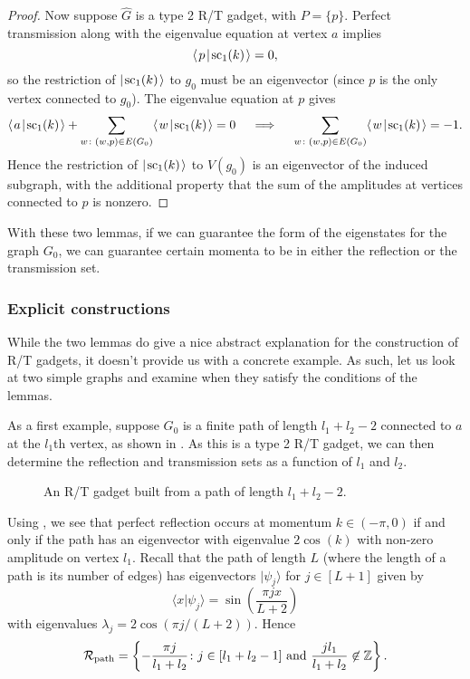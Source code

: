 \documentclass[../thesis-main/thesis-main]{subfiles}
\begin{document}
\begin{proof}
Now suppose $\widehat{G}$ is a type 2 R/T gadget, with $P = \{p\}$.  Perfect transmission along with the eigenvalue equation at vertex $a$ implies
\begin{equation}
\langle\mspace{2mu} p \mspace{2mu} | \mspace{2mu} \text{sc}_1(k)\mspace{2mu} \rangle = 0,
\end{equation}
so the restriction of $|\mspace{2mu} \text{sc}_1(k) \mspace{2mu} \rangle$ to $g_0$ must be an eigenvector (since $p$ is the only vertex connected to $g_0$).  The eigenvalue equation at $p$ gives
\begin{equation}
  \langle\mspace{2mu} a \mspace{2mu} | \mspace{2mu} \text{sc}_1(k)\mspace{2mu} \rangle 
  + \sum_{w \colon (w,p)\in E(G_0)} \langle\mspace{2mu} w \mspace{2mu} | \mspace{2mu} \text{sc}_1(k)\mspace{2mu} \rangle = 0 
  \quad\implies\quad
  \sum_{w \colon (w,p)\in E(G_0)} \langle\mspace{2mu} w \mspace{2mu} | \mspace{2mu} \text{sc}_1(k)\mspace{2mu} \rangle = -1.
\end{equation}
Hence the restriction of $|\mspace{2mu} \text{sc}_1(k) \mspace{2mu} \rangle$ to $V(g_0)$ is an eigenvector of the induced subgraph, with the additional property that the sum of the amplitudes at vertices connected to $p$ is nonzero.
\end{proof}

With these two lemmas, if we can guarantee the form of the eigenstates for the graph $G_0$, we can guarantee certain momenta to be in either the reflection or the transmission set.


\subsubsection{Explicit constructions}\label{sec:rt_ex}

While the two lemmas do give a nice abstract explanation for the construction of R/T gadgets, it doesn't provide us with a concrete example. As such, let us look at two simple graphs and examine when they satisfy the conditions of the lemmas.

As a first example, suppose $G_0$ is a finite path of length $l_1+l_2-2$ connected to $a$ at the $l_1$th vertex, as shown in .  As this is a type 2 R/T gadget, we can then determine the reflection and transmission sets as a function of $l_1$ and $l_2$.


\begin{figure}
  \centering
  
  \caption[An R/T gadget from a path]{An R/T gadget built from a path of length $l_1+l_2-2$. }
  \label{fig:RT_path}
\end{figure}


Using , we see that perfect reflection occurs at momentum $k\in (-\pi,0)$ if and only if the path has an eigenvector with eigenvalue $2\cos(k)$ with non-zero amplitude on vertex $l_1$.  Recall that the path of length $L$ (where the length of a path is its number of edges) has eigenvectors $|\psi_j\rangle$ for $j\in [L+1]$ given by
\begin{equation}
  \langle x | \psi_j \rangle = \sin\left(\frac{ \pi j x}{L+2}\right)\label{eq:vecs_line}
\end{equation}
with eigenvalues $\lambda_j = 2 \cos(\pi j/(L+2))$.  Hence
\begin{equation}
  \mathcal{R}_{\mathrm{path}} = \left\{ -\frac{\pi j}{l_1 + l_2} \colon j\in [l_1 + l_2 - 1] \text{ and } \frac{jl_1}{l_1+l_2} \not\in \mathbb{Z}\right\}.
\end{equation}
\end{document}
